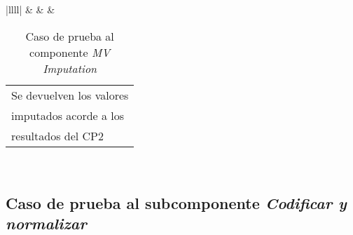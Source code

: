 \begin{table}[H]
\begin{spacing}{1.3}
{\begin{tabular}{|llll|}
			                                                                 &   &  & \begin{tabular}[c]{@{}l@{}}Se devuelven los valores\\ imputados acorde a los\\ resultados del CP2\end{tabular} \\ \hline
		\end{tabular}%
	}
	\end{spacing}
	\caption{Caso de prueba al componente \textit{MV Imputation}}
	\label{tab:cp-mv-imp}
\end{table}

\subsection{Caso de prueba al subcomponente \textit{Codificar y normalizar}}

